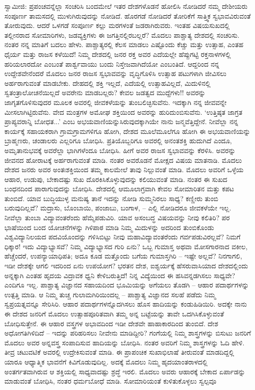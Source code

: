 ಸ್ವಾಮೀಜಿ: ಪ್ರಪಂಚವನ್ನೆಲ್ಲಾ ಸಂಚರಿಸಿ ಬಂದಮೇಲೆ ಇತರ ದೇಶಗಳೊಡನೆ ಹೋಲಿಸಿ ನೋಡಿದರೆ ನಮ್ಮ ದೇಶೀಯರು ಸಂಪೂರ್ಣ ತಾಮಸದಲ್ಲಿ ಮುಳುಗಿರುವುದನ್ನು ನೋಡಿದೆ. ಹೊರಗಡೆ ನೋಡಿದರೆ ತೋರಿಕೆಗೆ ಸಾತ್ತ್ವಿಕ ಸ್ವಭಾವವಿರುವಂತೆ ತೋರುವುದು. ಆದರೆ ಒಳಗಡೆ ಸಂಪೂರ್ಣ ಕಲ್ಲು ಮರಗಳಂತೆ ಜಡರಾಗಿರುವರು. ಇಂತಹ ವಿಷಯಸುಖದಲ್ಲಿ ತಲ್ಲೀನರಾದ ಸೋಮಾರಿಗಳು, ಜಡವ್ಯಕ್ತಿಗಳು ಈ ಜಗತ್ತಿನಲ್ಲಿರಬಲ್ಲರೆ? ಮೊದಲು ಪಾಶ್ಚಾತ್ಯ ದೇಶದಲ್ಲಿ ಸಂಚರಿಸು. ನಂತರ ನನ್ನ ಮಾತಿಗೆ ಬದಲು ಹೇಳು. ಪಾಶ್ಚಾತ್ಯರಲ್ಲಿ ಕೆಲಸ ಮಾಡಲು ಎಷ್ಟೊಂದು ಕೆಚ್ಚು ಮತ್ತು ಉತ್ಸಾಹ, ಎಂತಹ ಧೈರ್ಯ ಮತ್ತು ರಾಜಸ ಕಳೆಯಿದೆ! ನಿಮ್ಮ ದೇಶದಲ್ಲಿ ಜನರ ರಕ್ತ ಅವರ ಎದೆಯಲ್ಲೇ ಹೆಪ್ಪುಗಟ್ಟಿ ರಕ್ತನಾಳಗಳಲ್ಲಿ ಹರಿಯಲಾರದೋ ಎಂಬಂತೆ ಪಾರ್ಶ್ವವಾಯು ಬಂದು ನಿಸ್ತೇಜವಾಗಿದೆಯೋ ಎಂಬಂತಿದೆ. ಆದ್ದರಿಂದ ನನ್ನ ಉದ್ದೇಶವೇನೆಂದರೆ ಮೊದಲು ಜನರ ರಾಜಸ ಸ್ವಭಾವವನ್ನು ವೃದ್ಧಿಗೊಳಿಸಿ ಉತ್ಸಾಹ ಪಟುಗಳಾಗಿ ಜೀವಿಸಲು ಅರ್ಹರಾಗುವಂತೆ ಮಾಡಬೇಕು. ದೇಹದಲ್ಲಿ ಶಕ್ತಿ ಇಲ್ಲದೆ, ಎದೆಯಲ್ಲಿ ಉತ್ಸಾಹವಿಲ್ಲದೆ, ಮಿದುಳಿನಲ್ಲಿ ಸ್ವತಂತ್ರಾಲೋಚನೆಯಿಲ್ಲದೆ ಅವರೇನು ಮಾಡಬಲ್ಲರು? ಕೇವಲ ಜಡತ್ವದ ಮುದ್ದೆಗಳು!! ಅವರನ್ನು ಜಾಗೃತಗೊಳಿಸುವುದರ ಮೂಲಕ ಅವರಲ್ಲಿ ಜೀವಕಳೆಯನ್ನು ತುಂಬಲಿಚ್ಛಿಸುವೆನು. ಇದಕ್ಕಾಗಿ ನನ್ನ ಜೀವವನ್ನೇ ಮೀಸಲಾಗಿಟ್ಟಿರುವೆನು. ವೇದ ಮಂತ್ರಗಳ ಅಮೋಘ ಶಕ್ತಿಯಿಂದ ಅವರನ್ನು ಹುರಿದುಂಬಿಸುವೆನು. ‘ಉತ್ತಿಷ್ಠತ ಜಾಗ್ರತ ಪ್ರಾಪ್ಯವರಾನ್ನಿ ಬೋಧತ...’ ಎಂಬ ಅಭಯವಾಣಿಯನ್ನುಸಿರುವುದಕ್ಕಾಗಿಯೇ ನಾನು ಜನ್ಮವೆತ್ತಿದ್ದೇನೆ. ನೀವೆಲ್ಲಾ ನನ್ನ ಕಾರ್ಯಕ್ಕೆ ಸಹಾಯಕರಾಗಿ ಗ್ರಾಮಗ್ರಾಮಗಳಿಗೂ ಹೋಗಿ, ದೇಶದ ಮೂಲೆಮೂಲೆಗೂ ಹೋಗಿ ಈ ಅಭಯವಾಣಿಯನ್ನು ಬ್ರಾಹ್ಮಣರು, ಚಂಡಾಲರು ಎಲ್ಲರಿಗೂ ಬೋಧಿಸಿ. ಪ್ರತಿಯೊಬ್ಬರಿಗೂ ಅವರಲ್ಲಿ ಅನಂತಶಕ್ತಿ ಹುದುಗಿದೆ ಎಂದೂ, ಅಮೃತಾನುಭವಕ್ಕೆ ಅವರೆಲ್ಲಾ ಭಾಗಿಗಳೆಂದೂ ಬೋಧಿಸಿ. ಹೀಗೆ ಅವರ ರಾಜಸ ಸ್ವಭಾವವನ್ನು ಕೆರಳಿಸಿ. ಅವರನ್ನು ಜೀವನದ ಹೋರಾಟಕ್ಕೆ ಅರ್ಹರಾಗುವಂತೆ ಮಾಡಿ. ನಂತರ ಅವರೊಡನೆ ಮೋಕ್ಷದ ವಿಷಯ ಮಾತನಾಡಿ. ಮೊದಲು ದೇಶದ ಜನರು ಅವರ ಅಂತಃಶಕ್ತಿಯಿಂದ ತಮ್ಮ ಕಾಲಮೇಲೆ ತಾವು ನಿಲ್ಲುವಂತೆ ಮಾಡಿ. ಮೊದಲು ಅವರಿಗೆ ಒಳ್ಳೆಯ ಆಹಾರ, ಉಡುಪು, ಬೇಕಾದಷ್ಟು ಸುಖ ದೊರಕಿಸಿಕೊಳ್ಳುವುದನ್ನು ಕಲಿಯುವಂತೆ ಮಾಡಿ. ನಂತರ ಈ ಸುಖದ ಬಂಧನದಿಂದ ಪಾರಾಗುವುದನ್ನು ಬೋಧಿಸಿ. ದೇಶದಲ್ಲಿ ಆಮೂಲಾಗ್ರವಾಗಿ ಕೇವಲ ಸೋಮಾರಿತನ ಮತ್ತು ಕಪಟ ತುಂಬಿದೆ. ಯಾವ ಬುದ್ಧಿಯುಳ್ಳ ಮನುಷ್ಯ ತಾನೆ ಇದನ್ನು ನೋಡಿ ಸುಮ್ಮನಿರಲು ಸಾಧ್ಯ? ಕಣ್ಣೀರು ತುಂಬಿ ಬರುವುದಿಲ್ಲವೆ? ಮದ್ರಾಸು, ಬೊಂಬಾಯಿ, ಪಂಜಾಬು, ಬಂಗಾಳ, – ಎಲ್ಲಿ ನೋಡಿದರೂ ಜೀವಕಳೆಯೇ ಇಲ್ಲ. ನೀವೆಲ್ಲಾ ತುಂಬಾ ವಿದ್ಯಾವಂತರೆಂದು ಹೆಮ್ಮೆಪಡುವಿರಿ. ಯಾವ ಅಸಂಬದ್ಧ ವಿಷಯವನ್ನು ನೀವು ಕಲಿತಿರಿ? ಪರ ಭಾಷೆಯಿಂದ ಬಂದ ಯೋಚನೆಗಳನ್ನು ಗಿಳಿಪಾಠ ಮಾಡಿ ನಿಮ್ಮ ಮಿದುಳನ್ನು ಅದರಿಂದ ತುಂಬಿಕೊಂಡು ವಿಶ್ವವಿದ್ಯಾನಿಲಯದ ಪದವಿಯೊಂದನ್ನು ಗಳಿಸಿಬಿಟ್ಟು ನೀವು ಮಹಾವಿದ್ಯಾವಂತರೆಂದು ಗರ್ವಪಡುವಿರಲ್ಲವೆ? ನಿಮಗೆ ಧಿಕ್ಕಾರ! ಇದು ವಿದ್ಯಾಭ್ಯಾಸವೆ? ನಿಮ್ಮ ವಿದ್ಯಾಭ್ಯಾಸದ ಗುರಿ ಏನು? ಒಬ್ಬ ಗುಮಾಸ್ತ ಅಥವಾ ಮೋಸಗಾರನಾದ ವಕೀಲ, ಹೆಚ್ಚೆಂದರೆ, ಉಪನ್ಯಾಯಾಧಿಪತಿ; ಅದೂ ಕೂಡ ಮತ್ತೊಂದು ಬಗೆಯ ಗುಮಾಸ್ತಗಿರಿ – ಇಷ್ಟೇ ಅಲ್ಲವೆ? ನಿನಗಾಗಲಿ, ಇಡೀ ದೇಶಕ್ಕೇ ಆಗಲಿ ಇದರಿಂದ ಏನು ಉಪಯೋಗ? ಭರತನ ದೇಶ, ಐಶ್ವರ್ಯಕ್ಕೆ ಹೆಸರುವಾಸಿಯಾದ ದೇಶದಲ್ಲಿಂದು ಅನ್ನಕ್ಕಾಗಿ ಎಂತಹ ಹೃದಯ ವಿದ್ರಾವಕ ಧ್ವನಿ ಕೇಳಿಬರುತ್ತಿದೆ! ನಿನ್ನ ವಿದ್ಯೆಯಿಂದ ಈ ಹಸಿವನ್ನಡಗಿಸಲು ಸಾಧ್ಯವೇ? ಎಂದಿಗೂ ಇಲ್ಲ. ಪಾಶ್ಚಾತ್ಯ ವಿಜ್ಞಾನದ ಸಹಾಯದಿಂದ ಭೂಮಿಯನ್ನು ಅಗೆಯಲು ತೊಡಗಿ – ಆಹಾರ ಪದಾರ್ಥಗಳನ್ನು ಉತ್ಪತ್ತಿ ಮಾಡಿ. ಆ ನಿಮ್ಮ ತುಚ್ಚ ಗುಲಾಮಗಿರಿಯಿಂದಲ್ಲ – ಪಾಶ್ಚಾತ್ಯ ವಿಜ್ಞಾನದ ಸಲಹೆ ಪಡೆದು ನಿಮ್ಮ ಸ್ವಪ್ರಯತ್ನವನ್ನೂ ಸೇರಿಸಿರಿ. ಆಹಾರ ಪದಾರ್ಥಗಳನ್ನೊದಗಿಸಲು ಹೊಸ ಹಾದಿಯನ್ನು ಕಂಡುಹಿಡಿಯಿರಿ. ಅದಕ್ಕೇ ನಾನು ಈ ದೇಶದ ಜನರಿಗೆ ಮೊದಲು ಉತ್ಸಾಹಪೂರಿತವಾಗಿ ತಮ್ಮ ಅನ್ನ ಬಟ್ಟೆಯನ್ನು ತಾವೇ ಒದಗಿಸಿಕೊಳ್ಳುವಂತೆ ಬೋಧಿಸುತ್ತೇನೆ. ಈ ಆಹಾರ ವಸ್ತ್ರಗಳ ಅಭಾವದಿಂದ ಇಡೀ ದೇಶವೇ ಹಾಹಾಕಾರದಿಂದ ತುಂಬಿದೆ. ದೇಶ ಅಧೋಗತಿಗಿಳಿದಿದೆ – ಇದನ್ನು ಪರಿಹರಿಸಲು ನೀವೇನು ಮಾಡಿದ್ದೀರಿ? ಗಂಗೆಯಲ್ಲಿ ನಿಮ್ಮ ಶಾಸ್ತ್ರಗಳನ್ನು ಬಿಸುಟು ಜನರಿಗೆ ಮೊದಲು ಅವರ ಅನ್ನವಸ್ತ್ರ ಸಂಪಾದಿಸುವ ಹಾದಿಯನ್ನು ಬೋಧಿಸಿ. ನಂತರ ಅವರಿಗೆ ನಿಮ್ಮ ಶಾಸ್ತ್ರಗಳನ್ನು ಓದಿ ಹೇಳಿ. ತೀವ್ರ ಚಟುವಟಿಕೆ ಅವರಲ್ಲಿ ಉದ್ರೇಕಿಸುವಂತೆ ಮಾಡಿ. ಈ ಪ್ರಾಪಂಚಿಕ ಸುಖಾಭಿಲಾಷೆ ತೀರುವಂತೆ ಮಾಡದಿದ್ದಲ್ಲಿ ಯಾರೂ ಆಧ್ಯಾತ್ಮಿಕ ಭಾವನೆಗೆ ಕಿವಿಗೊಡುವುದಿಲ್ಲ. ಅದಕ್ಕೆ ಮೊದಲು ನಿಮ್ಮ ಹೃದಯಾಂತರಾಳದಲ್ಲಿ ಅಂತರ್ಗತವಾಗಿರುವ ಆ ಶಕ್ತಿಯಲ್ಲಿ ಸಾಧ್ಯವಾದಷ್ಟು ಶ್ರದ್ಧೆ ಇರಲಿ. ಮೊದಲು ಅವರು ಆಹಾರಕ್ಕೆ ಬೇಕಾದ ಏರ್ಪಾಡನ್ನು ಮಾಡುವಂತೆ ಬೋಧಿಸಿ, ನಂತರ ಧರ್ಮಬೋಧೆ ಮಾಡಿ. ಸೋಮಾರಿಯಂತೆ ಕುಳಿತುಕೊಳ್ಳಲು ಸ್ವಲ್ಪವೂ 